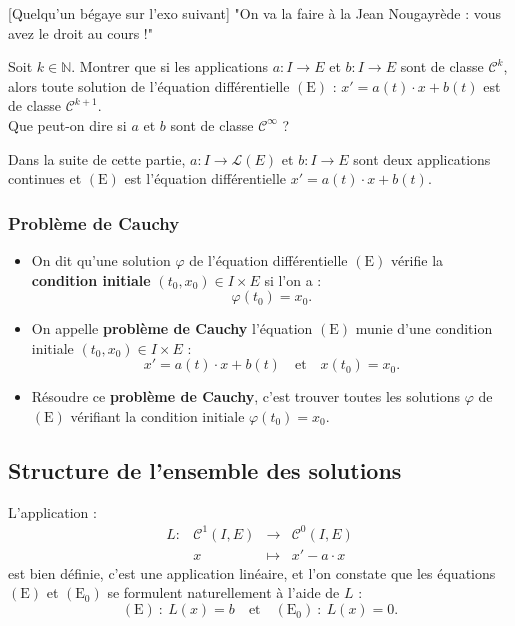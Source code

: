\documentclass[french]{article}
\newcommand{\N}{\mathbb{N}}
\theoremstyle{plain}
\theoremstyle{definition}
\theoremstyle{remark}
\begin{document}
[Quelqu'un bégaye sur l'exo suivant] "On va la faire à la Jean Nougayrède : vous avez le droit au cours !"

\begin{exo}
	Soit $k\in\N$. Montrer que si les applications $a:I\to E$ et $b:I\to E$ sont de classe $\mathcal{C}^k$, alors toute solution de l'équation différentielle $(\text{E})$ : $x'=a(t)\cdot x+b(t)$ est de classe $\mathcal{C}^{k+1}$.\\
	Que peut-on dire si $a$ et $b$ sont de classe $\mathcal{C}^\infty$ ?
\end{exo}

Dans la suite de cette partie, $a:I\to\mathcal{L}(E)$ et $b:I\to E$ sont deux applications continues et $(\text{E})$ est l'équation différentielle $x'=a(t)\cdot x+b(t)$.

\subsubsection*{Problème de Cauchy}

\begin{dfn}
	\begin{itemize}
		\item On dit qu'une solution $\varphi$ de l'équation différentielle $(\text{E})$ vérifie la \textbf{condition initiale} $(t_0,x_0)\in I\times E$ si l'on a :
		$$\varphi(t_0)=x_0.$$
		\item On appelle \textbf{problème de Cauchy} l'équation $(\text{E})$ munie d'une condition initiale $(t_0,x_0)\in I\times E$ :
		$$x'=a(t)\cdot x+b(t)\quad\text{et}\quad x(t_0)=x_0.$$
		\item Résoudre ce \textbf{problème de Cauchy}, c'est trouver toutes les solutions $\varphi$ de $(\text{E})$ vérifiant la condition initiale $\varphi(t_0)=x_0$.
	\end{itemize}
\end{dfn}

\subsection{Structure de l'ensemble des solutions}

L'application  :
$$\begin{array}{lrcl}
	L:&\mathcal{C}^1(I,E)&\longrightarrow&\mathcal{C}^0(I,E)\\
	&x&\longmapsto&x'-a\cdot x
\end{array}$$ est bien définie, c'est une application linéaire, et l'on constate que les équations $(\text{E})$ et $(\text{E}_0)$ se formulent naturellement à l'aide de $L$ :
$$(\text{E})\ :\ L(x)=b\quad\text{et}\quad (\text{E}_0)\ :\ L(x)=0.$$
\end{document}
